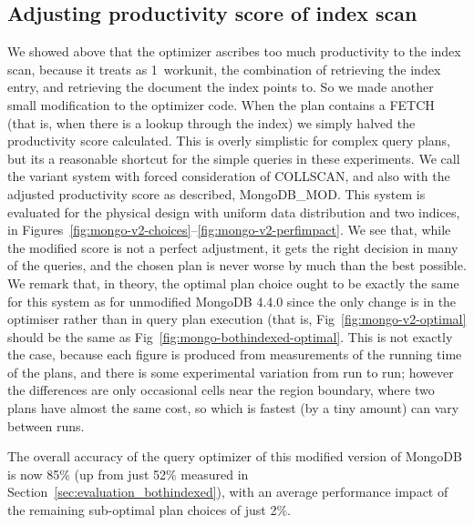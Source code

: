 \subsection{Adjusting productivity score of index scan}
We showed above that the optimizer ascribes too much productivity to the index scan, because it treats as 1~workunit, the combination of retrieving the index entry, and retrieving the document the index points to. So we made another small modification to the optimizer code. When the plan contains a FETCH (that is, when there is a lookup through the index) we simply halved the productivity score calculated. This is overly simplistic for complex query plans, but its a reasonable shortcut for the simple queries in these experiments. We call the variant system with forced consideration of COLLSCAN, and also with the adjusted productivity score as described, MongoDB\_MOD.  This system is evaluated for the physical design with uniform data distribution and two indices, in Figures~\ref{fig:mongo-v2-choices}--\ref{fig:mongo-v2-perfimpact}. We see that, while the modified score is not a perfect adjustment, it gets the right decision in many of the queries, and the chosen plan is never worse by much than the best possible. 
We remark that, in theory, the optimal plan choice ought to be exactly the same for this system as for unmodified MongoDB 4.4.0 since the only change is in the optimiser rather than in query plan execution (that is, Fig~\ref{fig:mongo-v2-optimal} should be the same as Fig~\ref{fig:mongo-bothindexed-optimal}. This is not exactly the case, because each figure is produced from measurements of the running time of the plans, and there is some experimental variation from run to run; however the differences are only occasional cells near the region boundary, where two plans have almost the same cost, so which is fastest (by a tiny amount) can vary between runs.

The overall accuracy of the query optimizer of this modified version of MongoDB is now 85\% (up from just 52\% measured in Section~\ref{sec:evaluation_bothindexed}), with an average performance impact of the remaining sub-optimal plan choices of just 2\%. 


